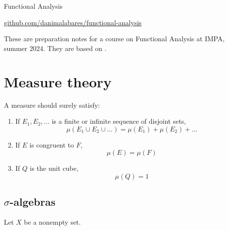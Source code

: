 \documentclass{article}
\theoremstyle{definition}
\numberwithin{equation}{section}
\begin{document}
	\begin{center}
		{\LARGE Functional Analysis}
		
		\href{https://github.com/danimalabares/functional-analysis/tree/main/functional-analysis}{github.com/danimalabares/functional-analysis}
	\end{center}
	These are preparation notes for a course on Functional Analysis at IMPA, summer 2024. They are based on \cite{folland,narici,brezis}.
	\tableofcontents
	\clearpage
	\section{Measure theory}
	{\small \color{blue}A measure should surely satisfy:
		\begin{enumerate}
			\item If $E_1,E_2,\ldots$ is a finite or infinite sequence of disjoint sets,
			\[\mu(E_1\cup E_2\cup\ldots)=\mu(E_1)+\mu(E_2)+\ldots\]
			
			\item If $E$ is congruent to $F$,
			\[\mu(E)=\mu(F)\]
			
			\item If $Q$ is the unit cube,
			\[\mu(Q)=1\]
	\end{enumerate}}
	\subsection{$\sigma$-algebras}\label{subsec:sigma-algebras}
	Let $X$ be a nonempty set. 
	
\end{document}
